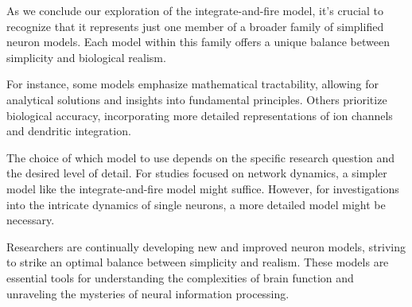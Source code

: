 As we conclude our exploration of the integrate-and-fire model, it's crucial to recognize that it represents just one member of a broader family of simplified neuron models. Each model within this family offers a unique balance between simplicity and biological realism.

For instance, some models emphasize mathematical tractability, allowing for analytical solutions and insights into fundamental principles. Others prioritize biological accuracy, incorporating more detailed representations of ion channels and dendritic integration.

The choice of which model to use depends on the specific research question and the desired level of detail. For studies focused on network dynamics, a simpler model like the integrate-and-fire model might suffice. However, for investigations into the intricate dynamics of single neurons, a more detailed model might be necessary.

Researchers are continually developing new and improved neuron models, striving to strike an optimal balance between simplicity and realism. These models are essential tools for understanding the complexities of brain function and unraveling the mysteries of neural information processing.



